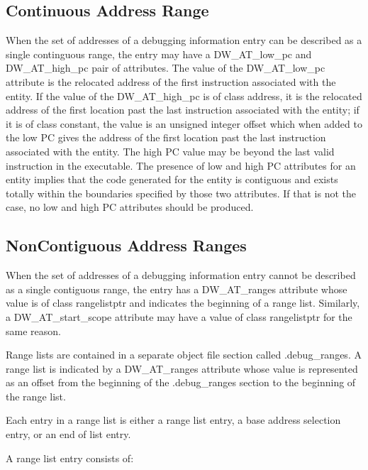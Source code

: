 \subsection{Continuous Address Range}
\label{chap:contiguousaddressranges}
When the set of addresses of a debugging information entry can
be described as a single continguous range, the entry may have
a DW\_AT\_low\_pc and DW\_AT\_high\_pc pair of attributes. The value
of the DW\_AT\_low\_pc attribute is the relocated address of the
first instruction associated with the entity. If the value of
the DW\_AT\_high\_pc is of class address, it is the relocated
address of the first location past the last instruction
associated with the entity; if it is of class constant, the
value is an unsigned integer offset which when added to the
low PC gives the address of the first location past the last
instruction associated with the entity.  The high PC value
may be beyond the last valid instruction in the executable.
The presence of low and high PC attributes for an entity
implies that the code generated for the entity is contiguous
and exists totally within the boundaries specified by those
two attributes. If that is not the case, no low and high PC
attributes should be produced.

\subsection{Non\dash Contiguous Address Ranges}
\label{chap:noncontiguousaddressranges}
When the set of addresses of a debugging information entry
cannot be described as a single contiguous range, the entry has
a DW\_AT\_ranges attribute whose value is of class rangelistptr
and indicates the beginning of a range list. Similarly,
a DW\_AT\_start\_scope attribute may have a value of class
rangelistptr for the same reason.  

Range lists are contained
in a separate object file section called .debug\_ranges. A
range list is indicated by a DW\_AT\_ranges attribute whose
value is represented as an offset from the beginning of the
.debug\_ranges section to the beginning of the range list.

Each entry in a range list is either a range list entry,
a base address selection entry, or an end of list entry.

A range list entry consists of:

